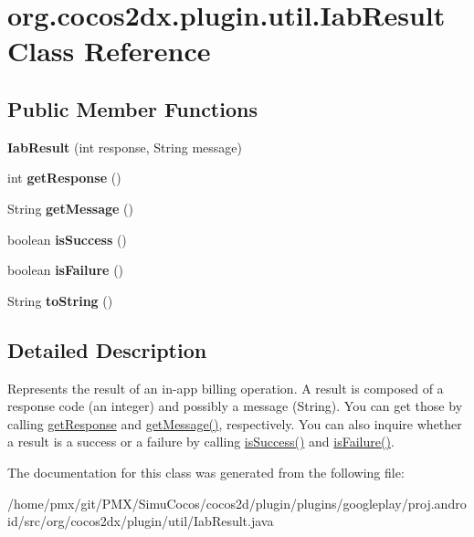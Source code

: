 \hypertarget{classorg_1_1cocos2dx_1_1plugin_1_1util_1_1IabResult}{}\section{org.\+cocos2dx.\+plugin.\+util.\+Iab\+Result Class Reference}
\label{classorg_1_1cocos2dx_1_1plugin_1_1util_1_1IabResult}
\subsection*{Public Member Functions}
\begin{DoxyCompactItemize}
\item 
\mbox{\label{classorg_1_1cocos2dx_1_1plugin_1_1util_1_1IabResult_a9d12ee3d5a57a1d94b92ea1a59eb088d}} 
{\bfseries Iab\+Result} (int response, String message)
\item 
\mbox{\label{classorg_1_1cocos2dx_1_1plugin_1_1util_1_1IabResult_a5c2adf65a2ff7fd33c56b5fdc3dde410}} 
int {\bfseries get\+Response} ()
\item 
\mbox{\label{classorg_1_1cocos2dx_1_1plugin_1_1util_1_1IabResult_afffc9ee6a2b04a5303faaae6f33e753a}} 
String {\bfseries get\+Message} ()
\item 
\mbox{\label{classorg_1_1cocos2dx_1_1plugin_1_1util_1_1IabResult_a81f99956680d0da677c63f5341514355}} 
boolean {\bfseries is\+Success} ()
\item 
\mbox{\label{classorg_1_1cocos2dx_1_1plugin_1_1util_1_1IabResult_a58c1ee2b5aff6ba9766827ef0dbc9554}} 
boolean {\bfseries is\+Failure} ()
\item 
\mbox{\label{classorg_1_1cocos2dx_1_1plugin_1_1util_1_1IabResult_a4aa8daad518aa6662d02f144adfdb51e}} 
String {\bfseries to\+String} ()
\end{DoxyCompactItemize}


\subsection{Detailed Description}
Represents the result of an in-\/app billing operation. A result is composed of a response code (an integer) and possibly a message (String). You can get those by calling \hyperlink{}{get\+Response} and \hyperlink{}{get\+Message()}, respectively. You can also inquire whether a result is a success or a failure by calling \hyperlink{}{is\+Success()} and \hyperlink{}{is\+Failure()}. 

The documentation for this class was generated from the following file\+:\begin{DoxyCompactItemize}
\item 
/home/pmx/git/\+P\+M\+X/\+Simu\+Cocos/cocos2d/plugin/plugins/googleplay/proj.\+android/src/org/cocos2dx/plugin/util/Iab\+Result.\+java\end{DoxyCompactItemize}
